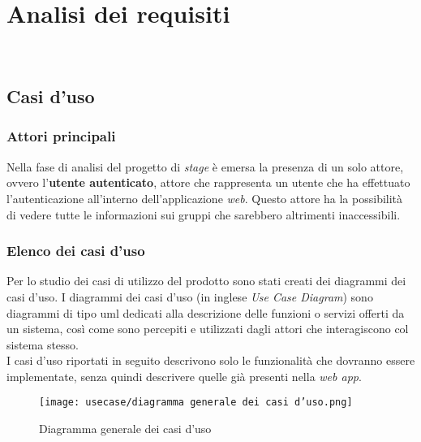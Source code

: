 
\chapter{Analisi dei requisiti}
\label{cap:analisi-requisiti}

\\

\section{Casi d'uso}
\subsection*{Attori principali}
Nella fase di analisi del progetto di \textit{stage} è emersa la presenza di un
solo attore, ovvero l'\textbf{utente autenticato},
attore che rappresenta un utente che ha effettuato l'autenticazione
all'interno dell'applicazione \textit{web}. Questo attore ha la possibilità di
vedere
tutte le informazioni sui gruppi che sarebbero altrimenti inaccessibili.

\subsection*{Elenco dei casi d'uso}
Per lo studio dei casi di utilizzo del prodotto sono stati creati dei diagrammi
dei casi d'uso.
I diagrammi dei casi d'uso (in inglese \emph{Use Case Diagram}) sono diagrammi
di tipo \gls{uml} dedicati alla descrizione delle funzioni o servizi offerti da
un sistema, così come sono percepiti e utilizzati dagli attori che
interagiscono col sistema stesso.\\
I casi d'uso riportati in seguito descrivono solo le funzionalità che dovranno
essere implementate, senza quindi descrivere quelle già presenti nella
\textit{web app}.
\begin{figure}[H]
    \centering
    \texttt{[image: usecase/diagramma generale dei casi
        d'uso.png]}
    \caption{Diagramma generale dei casi d'uso}
\end{figure}


